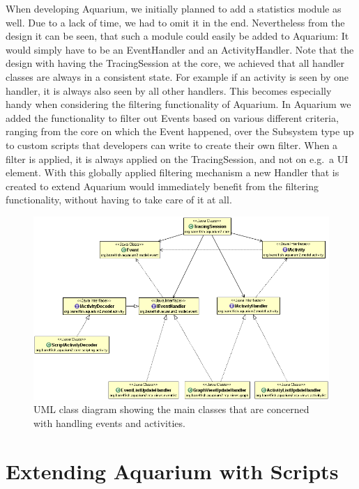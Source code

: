 \documentclass[a4paper,11pt,twoside]{report}
\begin{document}
When developing Aquarium, we initially planned to add a statistics module as
well. Due to a lack of time, we had to omit it in the end. Nevertheless from the
design it can be seen, that such a module could easily be added to Aquarium: It
would simply have to be an EventHandler and an ActivityHandler. Note that the
design with having the TracingSession at the core, we achieved that all handler
classes are always in a consistent state. For example if an activity is seen by
one handler, it is always also seen by all other handlers. This becomes
especially handy when considering the filtering functionality of Aquarium. In
Aquarium we added the functionality to filter out Events based on various
different criteria, ranging from the core on which the Event happened, over the
Subsystem type up to custom scripts that developers can write to create their
own filter. When a filter is applied, it is always applied on the
TracingSession, and not on e.g.~a UI element. With this globally applied
filtering mechanism a new Handler that is created to extend Aquarium would
immediately benefit from the filtering functionality, without having to take
care of it at all.

\begin{figure}[htb]
	\includegraphics[width=1\textwidth]{images/classdiag-output.png}
	\caption{UML class diagram showing the main classes that are concerned with
	handling events and activities.}
	\label{fig:classdiag-output}
\end{figure}

\section{Extending Aquarium with Scripts\label{sec:scripts}}
\end{document}
